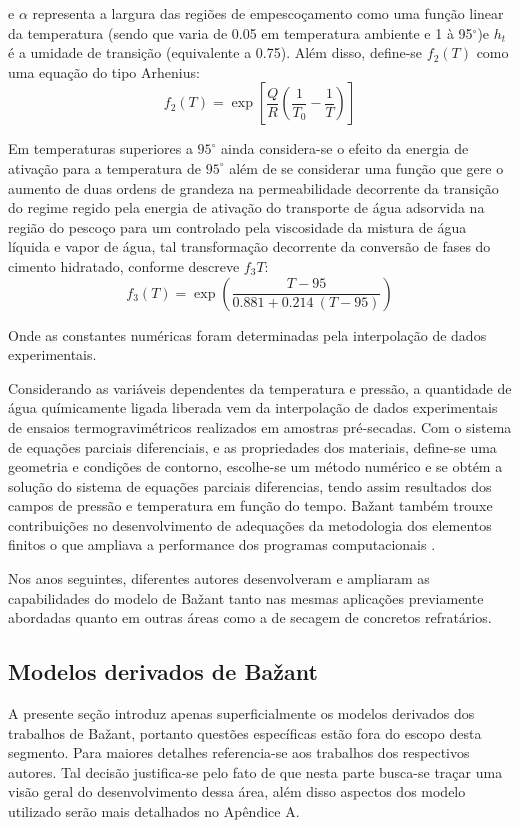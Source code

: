 e $\alpha$ representa a largura das regiões de empescoçamento como uma função
linear da temperatura (sendo que varia de 0.05 em temperatura ambiente e 1 à
95$^{\circ}$)e $h_t$ é a umidade de transição (equivalente a 0.75). Além disso,
define-se $f_2(T)$ como uma equação do tipo Arhenius:
\begin{equation}
  \label{eq:f2}
  f_2(T)  = \exp{\left[\frac{Q}{R}\left( \frac{1}{T_0} - \frac{1}{T} \right) \right]}
\end{equation}
    
    
Em temperaturas superiores a $95^{\circ}$ ainda considera-se o efeito da energia
de ativação para a temperatura de $95^{\circ}$ além de se considerar uma função
que gere o aumento de duas ordens de grandeza na permeabilidade decorrente da
transição do regime regido pela energia de ativação do transporte de água
adsorvida na região do pescoço para um controlado pela viscosidade da mistura de
água líquida e vapor de água, tal transformação decorrente da conversão de fases
do cimento hidratado, conforme descreve $f_3{T}$:
\begin{equation}
  \label{eq:f3}
  f_3(T) = \exp{\left( \frac{T-95}{0.881+0.214 \ (T-95)} \right)}
\end{equation}

Onde as constantes numéricas foram determinadas pela interpolação de dados
experimentais.

Considerando as variáveis dependentes da temperatura e pressão, a quantidade de
água químicamente ligada liberada vem da interpolação de dados experimentais de
ensaios termogravimétricos realizados em amostras pré-secadas. Com o sistema de
equações parciais diferenciais, e as propriedades dos materiais, define-se uma
geometria e condições de contorno, escolhe-se um método numérico e se obtém a
solução do sistema de equações parciais diferencias, tendo assim resultados dos
campos de pressão e temperatura em função do tempo. Ba\v{z}ant também trouxe
contribuições no desenvolvimento de adequações da metodologia dos elementos
finitos o que ampliava a performance dos programas computacionais \cite{bazant1978}.

Nos anos seguintes, diferentes autores desenvolveram e ampliaram as
capabilidades do modelo de Ba\v{z}ant tanto nas mesmas aplicações previamente
abordadas quanto em outras áreas como a de secagem de concretos refratários.
    
    
\subsection{Modelos derivados de Ba\v{z}ant}\label{sec:deriv_bazant}
A presente seção introduz apenas superficialmente os modelos derivados dos
trabalhos de Ba\v{z}ant, portanto questões específicas estão fora do escopo
desta segmento. Para maiores detalhes referencia-se aos trabalhos dos respectivos
autores. Tal decisão justifica-se pelo fato de que nesta parte busca-se traçar
uma visão geral do desenvolvimento dessa área, além disso aspectos dos modelo
utilizado serão mais detalhados no Apêndice A.

